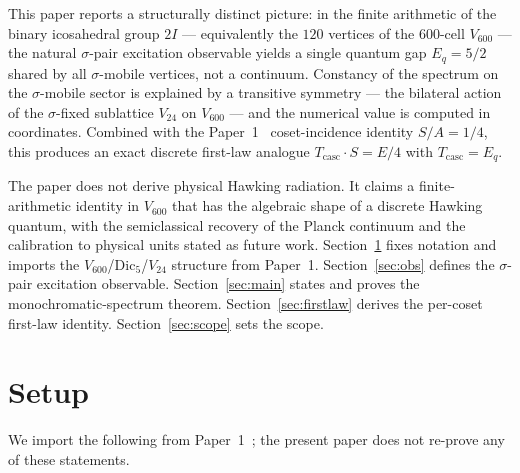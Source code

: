 \documentclass[11pt]{article}
\newcommand{\twoI}{2I}
\newcommand{\Vsixhundred}{V_{600}}
\newcommand{\Dicfive}{\mathrm{Dic}_5}
\newcommand{\Vtwentyfour}{V_{24}}
\newcommand{\sigmaG}{\sigma}
\newcommand{\Eq}{E_q}
\newcommand{\Tcasc}{T_{\mathrm{casc}}}
\begin{document}
This paper reports a structurally distinct picture: in the finite
arithmetic of the binary icosahedral group $\twoI$ — equivalently the
$120$ vertices of the $600$-cell $\Vsixhundred$ — the natural
$\sigmaG$-pair excitation observable yields a single quantum gap
$\Eq = 5/2$ shared by all $\sigmaG$-mobile vertices, not a continuum.
Constancy of the spectrum on the $\sigmaG$-mobile sector is explained
by a transitive symmetry — the bilateral action of the
$\sigmaG$-fixed sublattice $\Vtwentyfour$ on $\Vsixhundred$ — and the
numerical value is computed in coordinates.
Combined with the Paper~1~\citep{V600Paper1} coset-incidence identity
$S/A = 1/4$, this produces an exact discrete first-law analogue
$\Tcasc \cdot S = E/4$ with $\Tcasc = \Eq$.

The paper does not derive physical Hawking radiation. It claims a
finite-arithmetic identity in $\Vsixhundred$ that has the algebraic
shape of a discrete Hawking quantum, with the semiclassical recovery
of the Planck continuum and the calibration to physical units stated
as future work. Section~\ref{sec:setup} fixes notation and imports the
$\Vsixhundred$/$\Dicfive$/$\Vtwentyfour$ structure from Paper~1.
Section~\ref{sec:obs} defines the $\sigmaG$-pair excitation observable.
Section~\ref{sec:main} states and proves the monochromatic-spectrum
theorem. Section~\ref{sec:firstlaw} derives the per-coset first-law
identity. Section~\ref{sec:scope} sets the scope.

\section{Setup}\label{sec:setup}

We import the following from Paper~1~\citep{V600Paper1}; the present
paper does not re-prove any of these statements.
\end{document}
